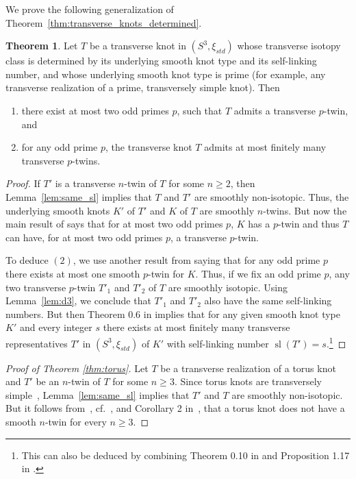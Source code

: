 \documentclass[11pt]{amsart}
\theoremstyle{definition}
\theoremstyle{definition}
\theoremstyle{definition}
\theoremstyle{definition}
\newtheorem{theorem}{Theorem}[section]
\begin{document}
We prove the following generalization of Theorem~\ref{thm:transverse_knots_determined}.

\begin{theorem}
    Let $T$ be a transverse knot in $(S^3,\xi_{std})$ whose transverse isotopy class is determined by its underlying smooth knot type and its self-linking number, and whose underlying smooth knot type is prime (for example, any transverse realization of a prime, transversely simple knot). Then
    \begin{enumerate}
        \item there exist at most two odd primes $p$, such that $T$ admits a transverse $p$-twin, and
        \item for any odd prime $p$, the transverse knot $T$ admits at most finitely many transverse $p$-twins.
    \end{enumerate} 
\end{theorem}

\begin{proof}
    If $T'$ is a transverse $n$-twin of $T$ for some $n\geq2$, then Lemma~\ref{lem:same_sl} implies that $T$ and $T'$ are smoothly non-isotopic.
    Thus, the underlying smooth knots $K'$ of $T'$ and $K$ of $T$ are smoothly $n$-twins. 
    But now the main result of \cite{Boileau_Paoluzzi} says that for at most two odd primes $p$, $K$ has a $p$-twin and thus $T$ can have, for at most two odd primes $p$, a transverse $p$-twin. 
    
    To deduce $(2)$, we use another result from \cite{Boileau_Paoluzzi} saying that for any odd prime $p$ there exists at most one smooth $p$-twin for $K$. Thus, if we fix an odd prime $p$, any two transverse $p$-twin $T'_1$ and $T'_2$ of $T$ are smoothly isotopic. Using Lemma~\ref{lem:d3}, we conclude that $T'_1$ and $T'_2$ also have the same self-linking numbers. But then Theorem 0.6 in \cite{Guyard} implies that for any given smooth knot type $K'$ and every integer $s$ there exists at most finitely many transverse representatives $T'$ in $(S^3,\xi_{std})$ of $K'$ with self-linking number $\operatorname{sl}(T')=s$.\footnote{This can also be deduced by combining Theorem 0.10 in \cite{Colin_Giroux_Honda_finiteness} and Proposition 1.17 in \cite{etnyre_neighborhood}.} 
\end{proof}

\begin{proof}[Proof of Theorem \ref{thm:torus}]
    Let $T$ be a transverse realization of a torus knot and $T'$ be an $n$-twin of $T$ for some $n\geq3$. Since torus knots are transversely simple~\cite{Etnyre_Honda}, Lemma~\ref{lem:same_sl} implies that $T'$ and $T$ are smoothly non-isotopic. But it follows from~\cite{Neumann}, cf.\ \cite{Paoluzzi_torus}, \cite{trefoil_universal} and Corollary 2 in~\cite{Paoluzzi_survey}, that a torus knot does not have a smooth $n$-twin for every $n\geq3$.
\end{proof}
\end{document}
